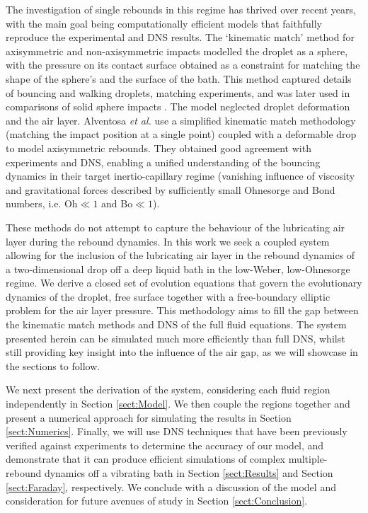 The investigation of single rebounds in this regime has thrived over recent years, with the main goal being computationally efficient models that faithfully reproduce the experimental and DNS results. 
The `kinematic match' method for axisymmetric \cite{galeano2017non} and non-axisymmetric impacts \cite{galeano2019quasi} modelled the droplet as a sphere, with the pressure on its contact surface obtained as a constraint for matching the shape of the sphere's and the surface of the bath. This method captured details of bouncing and walking droplets, matching experiments, and was later used in comparisons of solid sphere impacts \cite{galeano2021capillary}. The model neglected droplet deformation and the air layer. Alventosa \textit{et al.} \cite{alventosa2023inertio} use a simplified kinematic match methodology (matching the impact position at a single point) coupled with a deformable drop to model axisymmetric rebounds. They obtained good agreement with experiments and DNS, enabling a unified understanding of the bouncing dynamics in their target inertio-capillary regime (vanishing influence of viscosity and gravitational forces described by sufficiently small Ohnesorge and Bond numbers, i.e. $\text{Oh} \ll 1$ and $\text{Bo}\ll 1$).



These methods do not attempt to capture the behaviour of the lubricating air layer during the rebound dynamics. In this work we seek a coupled system allowing for the inclusion of the lubricating air layer in the rebound dynamics of a two-dimensional drop off a deep liquid bath in the low-Weber, low-Ohnesorge regime. We derive a closed set of evolution equations that govern the evolutionary dynamics of the droplet, free surface together with a free-boundary elliptic problem for the air layer pressure. This methodology aims to fill the gap between the kinematic match methods and  DNS of the full fluid equations. The system presented herein can be simulated much more efficiently than full DNS, whilst still providing key insight into the influence of the air gap, as we will showcase in the sections to follow.

We next present the derivation of the system, considering each fluid region independently in Section \ref{sect:Model}. We then couple the regions together and present a numerical approach for simulating the results in Section \ref{sect:Numerics}. Finally, we will use DNS techniques that have been previously verified against experiments to determine the accuracy of our model, and demonstrate that it can produce efficient simulations of complex multiple-rebound dynamics off a vibrating bath in Section \ref{sect:Results} and Section \ref{sect:Faraday}, respectively. We conclude with a discussion of the model and consideration for future avenues of study in Section \ref{sect:Conclusion}.
